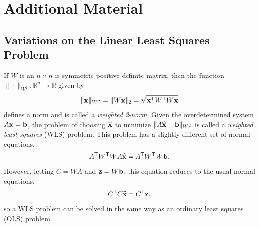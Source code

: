 %
%
%
%

\section*{Additional Material} %

\subsection*{Variations on the Linear Least Squares Problem} %

If $W$ is an $n\times n$ is symmetric positive-definite matrix, then the function $\|\cdot\|_{W^2}:\mathbb{R}^n\rightarrow\mathbb{R}$ given by
\[
\|\mathbf{x}\|_{W^2} = \|W\mathbf{x}\|_2 = \sqrt{\mathbf{x}^{\mathsf T} W^{\mathsf T} W\mathbf{x}}
\]
defines a norm and is called a \emph{weighted 2-norm}.
Given the overdetermined system $A\mathbf{x} = \mathbf{b}$, the problem of choosing $\widehat{\mathbf{x}}$ to minimize $\|A\widehat{\mathbf{x}} - \mathbf{b}\|_{W^2}$ is called a \emph{weighted least squares} (WLS) problem.
This problem has a slightly different set of normal equations,
\[
A^{\mathsf T} W^{\mathsf T} W A \widehat{\mathbf{x}} = A^{\mathsf T} W^{\mathsf T} W \mathbf{b}.
\]
However, letting $C = W A$ and $\mathbf{z} = W \mathbf{b}$, this equation reduces to the usual normal equations,
\[
C^{\mathsf T} C \widehat{\mathbf{x}} = C^{\mathsf T} \mathbf{z},
\]
so a WLS problem can be solved in the same way as an ordinary least squares (OLS) problem.

